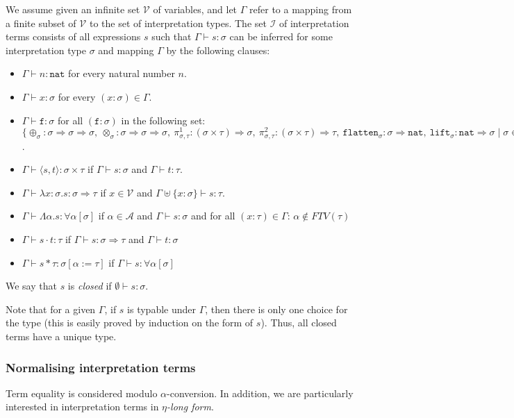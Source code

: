 \documentclass[runningheads,a4paper]{llncs}
\newcommand{\Iterms}{\mathcal{I}}
\newcommand{\Typevars}{\mathcal{A}}
\newcommand{\Vars}{\mathcal{V}}
\newcommand{\ITypes}{\mathcal{Y}}
\newcommand{\quant}[2]{\forall #1[#2]}
\newcommand{\arrtype}{\Rightarrow}
\newcommand{\abs}[2]{\lambda #1.#2}
\newcommand{\tabs}[2]{\Lambda #1.#2}
\newcommand{\app}[2]{#1 \cdot #2}
\newcommand{\tapp}[2]{#1 * #2}
\newcommand{\pair}[2]{\langle #1,#2 \rangle}
\newcommand{\subst}[2]{#1:=#2}
\newcommand{\FTV}{\mathit{FTV}}
\newcommand{\nat}{\mathtt{nat}}
\newcommand{\proj}{\pi}
\newcommand{\flatten}{\mathtt{flatten}}
\newcommand{\lift}{\mathtt{lift}}
\begin{document}
\begin{definition}\label{def_typing}
We assume given an infinite set $\Vars$ of variables, and let $\Gamma$
refer to a mapping from a finite subset of $\Vars$ to the set of
interpretation types.  The set $\Iterms$ of interpretation terms consists
of all expressions $s$ such that $\Gamma \vdash s : \sigma$ can be
inferred for some interpretation type $\sigma$ and mapping $\Gamma$ by
the following clauses:
\begin{itemize}
\item $\Gamma \vdash n : \nat$ for every natural number $n$.
\item $\Gamma \vdash x : \sigma$ for every $(x : \sigma) \in \Gamma$.
\item $\Gamma \vdash \mathtt{f} : \sigma$ for all $(\mathtt{f} :
  \sigma)$ in the following set: $\{ \oplus_\sigma : \sigma \arrtype
  \sigma \arrtype \sigma,\ \otimes_\sigma : \sigma \arrtype \sigma \arrtype
  \sigma,\ \proj^1_{\sigma,\tau} : (\sigma \times \tau) \arrtype
  \sigma,\ \proj^2_{\sigma,\tau} : (\sigma \times \tau) \arrtype \tau,\ 
  \flatten_{\sigma} : \sigma \arrtype \nat,\ 
  \lift_{\sigma} : \nat \arrtype \sigma
  \mid \sigma \in \ITypes \}$.
\item $\Gamma \vdash \pair{s}{t} : \sigma \times \tau$ if $\Gamma \vdash
  s : \sigma$ and $\Gamma \vdash t : \tau$.
\item $\Gamma \vdash \abs{x:\sigma}{s} : \sigma \arrtype \tau$ if $x
  \in \Vars$ and $\Gamma \uplus \{ x : \sigma \} \vdash s : \tau$.
\item $\Gamma \vdash \tabs{\alpha}{s} : \quant{\alpha}{\sigma}$ if
  $\alpha \in \Typevars$ and $\Gamma \vdash s : \sigma$ and for all
  $(x : \tau) \in \Gamma$: $\alpha \notin \FTV(\tau)$
\item $\Gamma \vdash \app{s}{t} : \tau$ if $\Gamma \vdash s :
  \sigma \arrtype \tau$ and $\Gamma \vdash t : \sigma$
\item $\Gamma \vdash \tapp{s}{\tau} : \sigma[\subst{\alpha}{\tau}]$ if
  $\Gamma \vdash s : \quant{\alpha}{\sigma}$
\end{itemize}
We say that $s$ is \emph{closed} if $\emptyset \vdash s : \sigma$.
\end{definition}

Note that for a given $\Gamma$, if $s$ is typable under $\Gamma$, then
there is only one choice for the type (this is easily proved by
induction on the form of $s$). Thus, all closed terms have a unique
type.

\subsubsection{Normalising interpretation terms}
Term equality is considered modulo $\alpha$-conversion.  In addition,
we are particularly interested in interpretation terms in
\emph{$\eta$-long form}.
\end{document}
